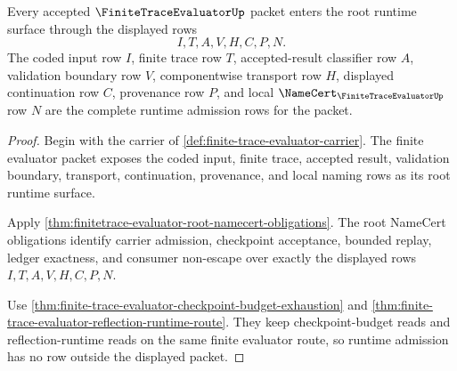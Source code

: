 \begin{theorem}
\label{thm:finitetrace-evaluator-root-runtime-admission}
Every accepted $\FiniteTraceEvaluatorUp$ packet enters the root runtime surface through the displayed rows
$$
I,T,A,V,H,C,P,N.
$$
The coded input row $I$, finite trace row $T$, accepted-result classifier row $A$, validation boundary row $V$, componentwise transport row $H$, displayed continuation row $C$, provenance row $P$, and local $\NameCert_{\FiniteTraceEvaluatorUp}$ row $N$ are the complete runtime admission rows for the packet.
\end{theorem}
\begin{proof}
Begin with the carrier of \autoref{def:finite-trace-evaluator-carrier}. The finite evaluator packet exposes the coded input, finite trace, accepted result, validation boundary, transport, continuation, provenance, and local naming rows as its root runtime surface.

Apply \autoref{thm:finitetrace-evaluator-root-namecert-obligations}. The root NameCert obligations identify carrier admission, checkpoint acceptance, bounded replay, ledger exactness, and consumer non-escape over exactly the displayed rows $I,T,A,V,H,C,P,N$.

Use \autoref{thm:finite-trace-evaluator-checkpoint-budget-exhaustion} and \autoref{thm:finite-trace-evaluator-reflection-runtime-route}. They keep checkpoint-budget reads and reflection-runtime reads on the same finite evaluator route, so runtime admission has no row outside the displayed packet.
\end{proof}

